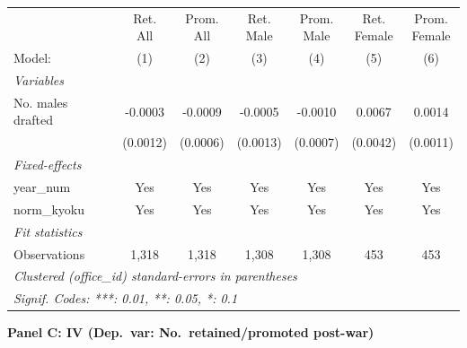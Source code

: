 \begin{table}[htbp]
\begin{threeparttable}
\begin{tabular}{lcccccc}
   \tabularnewline \midrule \midrule
                        & \makecell{Ret.\\All}    & \makecell{Prom.\\All}    & \makecell{Ret.\\Male}    & \makecell{Prom.\\Male}    & \makecell{Ret.\\Female}    & \makecell{Prom.\\Female} \\      
   Model:               & (1)                     & (2)                      & (3)                      & (4)                       & (5)                        & (6)\\  
   \midrule
   \emph{Variables}\\
   No. males drafted    & -0.0003                 & -0.0009                  & -0.0005                  & -0.0010                   & 0.0067                     & 0.0014\\   
                        & (0.0012)                & (0.0006)                 & (0.0013)                 & (0.0007)                  & (0.0042)                   & (0.0011)\\   
   \midrule
   \emph{Fixed-effects}\\
   year\_num            & Yes                     & Yes                      & Yes                      & Yes                       & Yes                        & Yes\\  
   norm\_kyoku          & Yes                     & Yes                      & Yes                      & Yes                       & Yes                        & Yes\\  
   \midrule
   \emph{Fit statistics}\\
   Observations         & 1,318                   & 1,318                    & 1,308                    & 1,308                     & 453                        & 453\\  
   \midrule \midrule
   \multicolumn{7}{l}{\emph{Clustered (office\_id) standard-errors in parentheses}}\\
   \multicolumn{7}{l}{\emph{Signif. Codes: ***: 0.01, **: 0.05, *: 0.1}}\\
\end{tabular}

\bigskip

\textbf{Panel C: IV (Dep.\ var: No.\ retained/promoted post-war)}
\medskip


\end{threeparttable}
\end{table}
